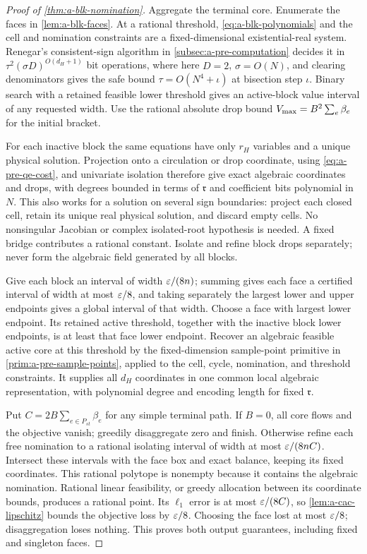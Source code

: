 \begin{proof}[Proof of \cref{thm:a-blk-nomination}]
Aggregate the terminal core. Enumerate the faces in \cref{lem:a-blk-faces}.
At a rational threshold, \cref{eq:a-blk-polynomials} and the cell and
nomination constraints are a fixed-dimensional existential-real
system. Renegar's consistent-sign algorithm in
\cref{subsec:a-pre-computation} decides it in
$\tau^2(\sigma D)^{O(d_H+1)}$ bit operations, where here $D=2$,
$\sigma=O(N)$, and clearing denominators gives the safe bound
$\tau=O(N^4+\iota)$ at bisection step $\iota$.
Binary search with a retained feasible lower threshold gives an
active-block value interval of any requested width. Use the rational
absolute drop bound $V_{\max}=B^2\sum_e\beta_e$ for the initial bracket.

For each inactive block the same equations have only $r_H$ variables
and a unique physical solution. Projection onto a circulation or drop
coordinate, using \cref{eq:a-pre-qe-cost}, and univariate isolation
therefore give exact algebraic coordinates and drops, with degrees
bounded in terms of $\mathfrak r$ and coefficient bits polynomial
in $N$. This also works for a solution on several sign boundaries:
project each closed cell, retain its unique real physical solution,
and discard empty cells. No nonsingular Jacobian or complex isolated-root
hypothesis is needed. A fixed bridge contributes a rational constant.
Isolate and refine block drops separately; never form the algebraic
field generated by all blocks.

Give each block an interval of width $\varepsilon/(8n)$; summing gives each
face a certified interval of width at most $\varepsilon/8$, and taking
separately the largest lower and upper endpoints gives a global
interval of that width. Choose a face with largest lower endpoint. Its retained active
threshold, together with the inactive block lower endpoints, is at
least that face lower endpoint. Recover an algebraic feasible active
core at this threshold by the fixed-dimension sample-point primitive
in \cref{prim:a-pre-sample-points}, applied to the cell, cycle, nomination,
and threshold constraints. It supplies all $d_H$ coordinates in one
common local algebraic representation, with polynomial degree and
encoding length for fixed $\mathfrak r$.

Put $C=2B\sum_{e\in P_{st}}\beta_e$ for any simple terminal path.
If $B=0$, all core flows and the objective vanish; greedily disaggregate
zero and finish. Otherwise refine each free nomination to a rational
isolating interval of width at most $\varepsilon/(8nC)$. Intersect these
intervals with the face box and exact balance, keeping its fixed
coordinates. This rational polytope is nonempty because it contains
the algebraic nomination. Rational linear feasibility, or greedy
allocation between its coordinate bounds, produces a rational point.
Its $\ell_1$ error is at most $\varepsilon/(8C)$, so
\cref{lem:a-cac-lipschitz} bounds the objective loss by $\varepsilon/8$.
Choosing the face lost at most $\varepsilon/8$; disaggregation loses nothing.
This proves both output guarantees, including fixed and singleton faces.


\end{proof}
